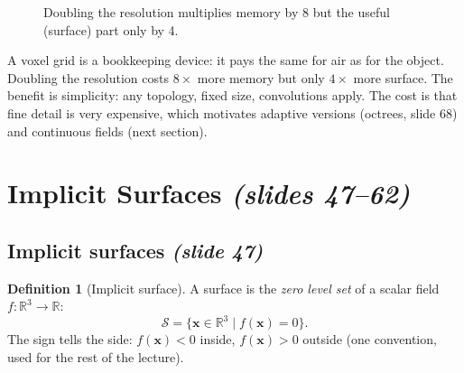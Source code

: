 \documentclass[11pt,a4paper]{article}
\newcommand{\R}{\mathbb{R}}
\newcommand{\Surf}{\mathcal{S}}
\newcommand{\vx}{\bm{x}}
\theoremstyle{definition}
\newtheorem{definition}{Definition}[section]
\theoremstyle{plain}
\theoremstyle{remark}
\newcommand{\slides}[1]{\texorpdfstring{\emph{(#1)}}{(#1)}}
\begin{document}
\begin{figure}[ht]
\centering
{}
\caption{Doubling the resolution multiplies memory by 8 but the useful (surface) part only by 4.}
\end{figure}

\begin{intuition}
A voxel grid is a bookkeeping device: it pays the same for air as for the object. Doubling the resolution costs $8\times$ more memory but only $4\times$ more surface. The benefit is simplicity: any topology, fixed size, convolutions apply. The cost is that fine detail is very expensive, which motivates adaptive versions (octrees, slide 68) and continuous fields (next section).
\end{intuition}

\section{Implicit Surfaces \slides{slides 47--62}}

\subsection{Implicit surfaces \slides{slide 47}}
\begin{definition}[Implicit surface]
A surface is the \emph{zero level set} of a scalar field $f:\R^3\to\R$:
\[
\Surf=\{\vx\in\R^3\mid f(\vx)=0\}.
\]
The sign tells the side: $f(\vx)<0$ inside, $f(\vx)>0$ outside (one convention, used for the rest of the lecture).
\end{definition}
\end{document}
